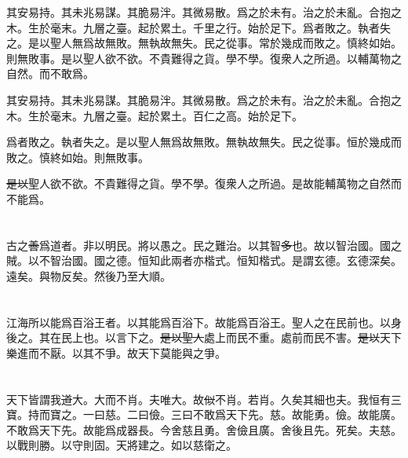 \documentclass[a5paper]{ctexbook}
\newcommand{\he}[1]{\textcolor[RGB]{255,0,255}{#1}}
\newcommand{\bo}[1]{\textcolor[RGB]{0,255,255}{#1}}
\newcommand{\jian}[1]{\textcolor[RGB]{0,255,0}{#1}}
\def\del{\sout}
\begin{document}
    其安易持。其未兆易謀。其脆易泮。其微易散。爲之於未有。治之於未亂。合抱之木。生於毫末。九層之臺。起於累土。千里之行。始於足下。爲者敗之。執者失之。是以聖人無爲故無敗。無執故無失。民之從事。常於幾成而敗之。慎終如始。則無敗事。是以聖人欲不欲。不貴難得之貨。學不學。復衆人之所過。以輔萬物之自然。而不敢爲。

    其安易持。其未兆易謀。其脆易泮。其微易散。爲之於未有。治之於未亂。合抱之木。生於毫末。九層之臺。起於累土。\bo{百仁之高}。始於足下。

    爲者敗之。執者失之。是以聖人無爲故無敗。無執故無失。民之從事。\bo{恒}於幾成而敗之。慎終如始。則無敗事。

    \jian{\del{是以}}聖人欲不欲。不貴難得之貨。學不學。復衆人之所過。\jian{是故}\jian{能}輔萬物之自然而不\jian{能}爲。

    \chapter{}

    古之\bo{\del{善}}爲道者。非以明民。將以愚之。民之難治。以其智\bo{\del{多}}\bo{也}。故以智治國。國之賊。\bo{以不智}治國。國之\bo{德}。\bo{恒}知此兩者亦\he{楷式}。\bo{恒}知\he{楷式}。是謂玄德。玄德深矣。遠矣。與物反矣。然後乃至大順。

    \chapter{}

    江海所以能爲百\bo{浴}王者。以其\jian{能爲百浴下}。故能爲百\bo{浴}王。\jian{聖人之在民前也。以身後之}。\jian{其在民上也。以言下之}。\jian{\del{是以}}\jian{\del{聖人}}處上而民不重。處前而民不害。\jian{\del{是以}}天下樂\jian{進}而不厭。以其不爭。故天下莫能與之爭。

    \chapter{}

    天下皆謂我\bo{\del{道}}大。\bo{大而不肖}。夫唯大。故\bo{\del{似}}不肖。若肖。久矣其細也夫。我\bo{恒}有三寶。持而寶之。一曰慈。二曰儉。三曰不敢爲天下先。慈。故能勇。儉。故能廣。不敢爲天下先。故能\bo{爲}成器長。今舍慈且勇。舍儉且廣。舍後且先。死矣。夫慈。以戰則勝。以守則固。天將\bo{建}之。\bo{如}以慈衛之。

    \chapter{}
\end{document}
